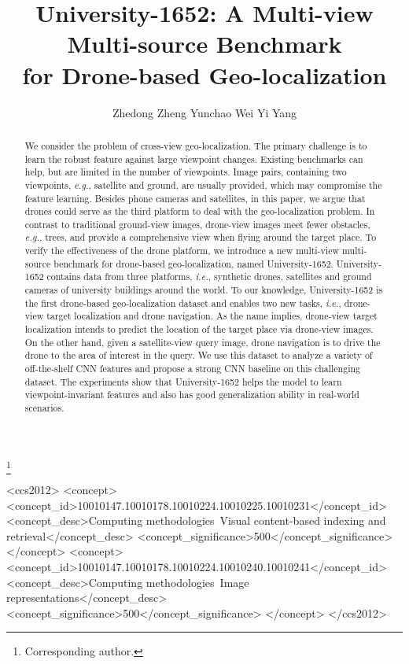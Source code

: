 \documentclass[sigconf]{acmart}
\def\eg{\emph{e.g.}}
\def\ie{\emph{i.e.}}
\begin{document}
\fancyhead{}
\title{ University-1652: A Multi-view Multi-source Benchmark \\ for Drone-based Geo-localization}

\author{  
Zhedong Zheng \quad Yunchao Wei \quad Yi Yang  } 
\thanks{Corresponding author.}


\begin{abstract}
We consider the problem of cross-view geo-localization. 
The primary challenge is to learn the robust feature against large viewpoint changes. Existing benchmarks can help, but are limited in the number of viewpoints. Image pairs, containing two viewpoints, \eg, satellite and ground, are usually provided, which may compromise the feature learning. Besides phone cameras and satellites, in this paper, we argue that drones could serve as the third platform to deal with the geo-localization problem. In contrast to traditional ground-view images, drone-view images meet fewer obstacles, \eg, trees, and provide a comprehensive view when flying around the target place. To verify the effectiveness of the drone platform, we introduce a new multi-view multi-source benchmark for drone-based geo-localization, named University-1652. University-1652 contains data from three platforms, \ie, synthetic drones, satellites and ground cameras of  university buildings around the world.
To our knowledge, University-1652 is the first drone-based geo-localization dataset and enables two new tasks, \ie, drone-view target localization and drone navigation.
As the name implies, drone-view target localization intends to predict the location of the target place via drone-view images. On the other hand, given a satellite-view query image, drone navigation is to drive the drone to the area of interest in the query.
We use this dataset to analyze a variety of off-the-shelf CNN features and propose a strong CNN baseline on this challenging dataset. The experiments show that University-1652 helps the model to learn viewpoint-invariant features and also has good generalization ability in real-world scenarios. 
\end{abstract}

\begin{CCSXML}
<ccs2012>
   <concept>
       <concept_id>10010147.10010178.10010224.10010225.10010231</concept_id>
       <concept_desc>Computing methodologies~Visual content-based indexing and retrieval</concept_desc>
       <concept_significance>500</concept_significance>
       </concept>
   <concept>
       <concept_id>10010147.10010178.10010224.10010240.10010241</concept_id>
       <concept_desc>Computing methodologies~Image representations</concept_desc>
       <concept_significance>500</concept_significance>
       </concept>
 </ccs2012>
\end{CCSXML}
\end{document}
